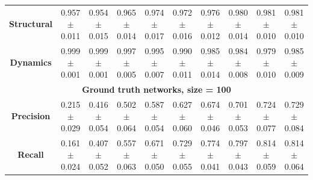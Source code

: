 \begin{table}[h!]
\begin{tabular}{|c|ccccccccc|}
\textbf{Structural} & \makecell{0.957\\$\pm$0.011} & \makecell{0.954\\$\pm$0.015} & \makecell{0.965\\$\pm$0.014} & \makecell{0.974\\$\pm$0.017} & \makecell{0.972\\$\pm$0.016} & \makecell{0.976\\$\pm$0.012} & \makecell{0.980\\$\pm$0.014} & \makecell{0.981\\$\pm$0.010} & \makecell{0.981\\$\pm$0.010} \\
\textbf{Dynamics} & \makecell{0.999\\$\pm$0.001} & \makecell{0.999\\$\pm$0.001} & \makecell{0.997\\$\pm$0.005} & \makecell{0.995\\$\pm$0.007} & \makecell{0.990\\$\pm$0.011} & \makecell{0.985\\$\pm$0.014} & \makecell{0.984\\$\pm$0.008} & \makecell{0.979\\$\pm$0.010} & \makecell{0.985\\$\pm$0.009} \\
\hline
\multicolumn{10}{|c|}{\textbf{Ground truth networks, size = 100}} \\
\hline
\textbf{Precision} & 
\makecell{0.215 \\ $\pm$0.029} & \makecell{0.416 \\ $\pm$0.054} & \makecell{0.502 \\ $\pm$0.064} & \makecell{0.587 \\ $\pm$0.054} & 
\makecell{0.627 \\ $\pm$0.060} & \makecell{0.674 \\ $\pm$0.046} & \makecell{0.701 \\ $\pm$0.053} & \makecell{0.724 \\ $\pm$0.077} & \makecell{0.729 \\ $\pm$0.084} \\
\hline
\textbf{Recall} & 
\makecell{0.161 \\ $\pm$0.024} & \makecell{0.407 \\ $\pm$0.052} & \makecell{0.557 \\ $\pm$0.063} & \makecell{0.671 \\ $\pm$0.050} & 
\makecell{0.729 \\ $\pm$0.055} & \makecell{0.774 \\ $\pm$0.041} & \makecell{0.797 \\ $\pm$0.043} & \makecell{0.814 \\ $\pm$0.059} & \makecell{0.814 \\ $\pm$0.064} \\

\end{tabular}
\end{table}
